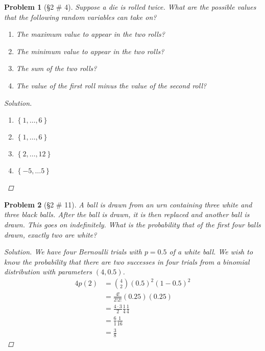 \documentclass[11pt, oneside]{book}   	%
\newtheorem{problem}{Problem}[chapter]
\newcommand{\set}[1]{\left\{#1\right\}}
\begin{document}
\begin{problem}[\S 2 \# 4]
	Suppose a die is rolled twice. What are the possible values that the following random variables can take on? 
	\begin{enumerate}
		\item The maximum value to appear in the two rolls?
		\item The minimum value to appear in the two rolls? 
		\item The sum of the two rolls? 
		\item The value of the first roll minus the value of the second roll? 
	\end{enumerate}
	\begin{proof}[Solution]
		\
		\begin{enumerate}
			\item $\set{1, \dots, 6}$
			\item $\set{1, \dots, 6}$
			\item $\set{2, \dots, 12}$
			\item $\set{-5, \dots 5}$
		\end{enumerate}
	\end{proof}
\end{problem}

\begin{problem}[\S 2 \# 11]
	A ball is drawn from an urn containing three white and three black balls. After the ball is drawn, it is then replaced and another ball is drawn. This goes on indefinitely. What is the probability that of the first four balls drawn, exactly two are white?
	\begin{proof}[Solution]
		We have four Bernoulli trials with $p=0.5$ of a white ball. We wish to know the probability that there are two successes in four trials from a binomial distribution with parameters $(4, 0.5)$. 
		\begin{alignat}{4}
			p(2)&=\binom{4}{2}(0.5)^2(1-0.5)^2 \\
				&=\frac{4!}{2! 2!}(0.25)(0.25) \\
				&=\frac{4\cdot 3}{2}\frac{1}{4}\frac{1}{4} \\
				&=\frac{6}{1}\frac{1}{16} \\
				&=\frac{3}{8}
		\end{alignat}
	\end{proof}
\end{problem}
\end{document}

